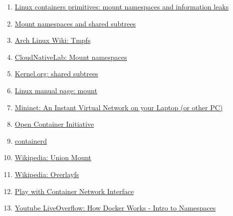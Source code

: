 \documentclass[12pt]{article}
\begin{document}
\begin{enumerate}
		\item
		\label{bib: mount namespace info 1}
		\href{https://www.schutzwerk.com/en/43/posts/namespaces_02_mnt/}{Linux containers primitives: mount namespaces and information leaks}
		
		\item
		\label{bib: mount namespace info 2}
		\href{https://lwn.net/Articles/689856/}{Mount namespaces and shared subtrees}
		
		\item
		\label{bib: tmpfs arch linux}
		\href{https://wiki.archlinux.org/title/Tmpfs}{Arch Linux Wiki: Tmpfs}
		
		\item
		\label{bib: mount namespaces containerlabs}
		\href{https://www.containerlabs.kubedaily.com/LXC/Linux%20Containers/Mount-namespaces.html}{CloudNativeLab: Mount namespaces}
		
		\item
		\label{bib: mount namespaces shared subtree}
		\href{https://www.kernel.org/doc/Documentation/filesystems/sharedsubtree.txt}{Kernel.org: shared subtrees}
		
		\item
		\label{bib: mount namespaces shared subtree 2}
		\href{https://man7.org/linux/man-pages/man8/mount.8.html}{Linux manual page: mount}
		
		\item
		\label{bib: mininet home page}
		\href{http://mininet.org/}{Mininet: An Instant Virtual Network on your Laptop (or other PC)}
		
		\item
		\label{bib: oci}
		\href{https://opencontainers.org/}{Open Container Initiative}
		
		\item
		\label{bib: containerd}
		\href{https://containerd.io/}{containerd}
		
		\item
		\label{bib: union mount}
		\href{https://en.wikipedia.org/wiki/Union_mount}{Wikipedia: Union Mount}
		
		\item
		\label{bib: overlayfs}
		\href{https://en.wikipedia.org/wiki/OverlayFS}{Wikipedia: Overlayfs}
		
		\item
		\label{bib: docker y namespaces}
		\href{https://arthurchiao.art/blog/play-with-container-network-if/}{Play with Container Network Interface}
		
		\item
		\label{bib: docker works namespaces}
		\href{https://www.youtube.com/watch?v=-YnMr1lj4Z8}{Youtube LiveOverflow: How Docker Works - Intro to Namespaces}
		
		
		
	\end{enumerate}
\end{document}
